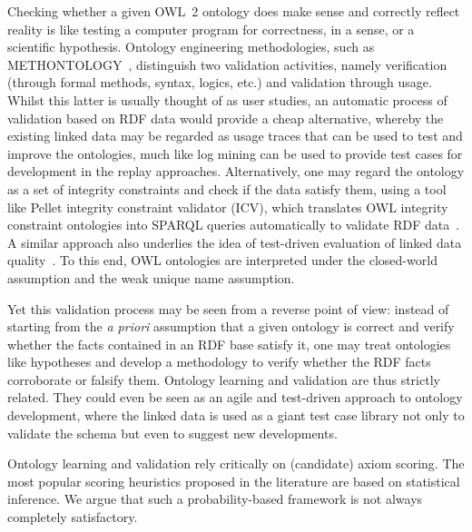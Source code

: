\documentclass{llncs}
\begin{document}
Checking whether a given OWL~2 ontology does make sense and correctly reflect reality
is like testing a computer program for correctness, in a sense, or a scientific hypothesis.
Ontology engineering methodologies, such as METHONTOLOGY~\cite{FernandezGomezJuristo1997},
distinguish two validation activities, namely verification (through formal methods, syntax, logics, etc.)
and validation through usage. Whilst this latter is usually thought of as user studies,
an automatic process of validation based on RDF data would provide a cheap alternative,
whereby the existing linked data may be regarded as usage traces that can be used
to test and improve the ontologies, much like log mining can be used to provide
test cases for development in the replay approaches.
Alternatively, one may regard the ontology as a set of integrity constraints and check if the
data satisfy them, using a tool like Pellet integrity constraint validator (ICV),
which translates OWL integrity constraint ontologies into SPARQL queries automatically
to validate RDF data~\cite{SirinTao2009}.
A similar approach also underlies the idea of test-driven evaluation of linked data 
quality~\cite{KontokostasWestphalAuerHellmannLehmannCornelissen2014}.
To this end, OWL ontologies are interpreted under the closed-world assumption and
the weak unique name assumption. 

Yet this validation process may be seen from a reverse point of view:
instead of starting from the \emph{a priori} assumption that a given ontology
is correct and verify whether the facts contained in an RDF base satisfy it,
one may treat ontologies like hypotheses and develop a methodology to verify
whether the RDF facts corroborate or falsify them. Ontology learning and validation
are thus strictly related.
They could even be seen as an agile and test-driven approach to ontology development,
where the linked data is used as a giant test case library not only to validate the
schema but even to suggest new developments.

Ontology learning and validation rely critically on (candidate) axiom scoring.
The most popular scoring heuristics proposed in the literature are based on statistical inference.
We argue that such a probability-based framework is not always completely satisfactory.
\end{document}
